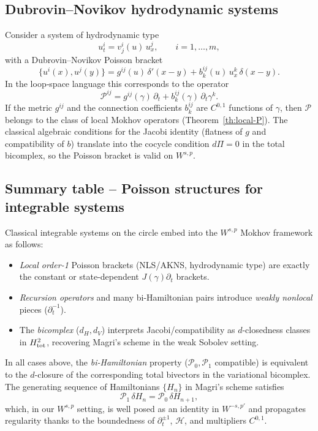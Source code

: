 \documentclass{amsart}
\newcounter{ex}
\newcounter{re}
\begin{document}
\subsection{Dubrovin–Novikov hydrodynamic systems}
Consider a system of hydrodynamic type
\[
u^{i}_{t}=v^{i}_{j}(u)\,u^{j}_{x},\qquad i=1,\dots,m,
\]
with a Dubrovin–Novikov Poisson bracket
\[
\{u^{i}(x),u^{j}(y)\}
   =g^{ij}(u)\,\delta'(x-y)
     +b^{ij}_{k}(u)\,u^{k}_{x}\,\delta(x-y).
\]
In the loop‑space language this corresponds to the operator
\[
\mathcal P^{ij}=g^{ij}(\gamma)\,\partial_{t}
                +b^{ij}_{k}(\gamma)\,\partial_{t}\gamma^{k}.
\]
If the metric \(g^{ij}\) and the connection coefficients \(b^{ij}_{k}\) are
\(C^{0,1}\) functions of \(\gamma\), then \(\mathcal P\) belongs to the class of
local Mokhov operators (Theorem~\ref{th:local-P}).  The classical algebraic
conditions for the Jacobi identity (flatness of \(g\) and compatibility of
\(b\)) translate into the cocycle condition \(d\Pi=0\) in the total bicomplex,
so the Poisson bracket is valid on \(W^{s,p}\).

\subsection{ Summary table – Poisson structures for integrable systems }

Classical integrable systems on the circle embed into the $W^{s,p}$
Mokhov framework as follows:
\begin{itemize}
\item \emph{Local order-1} Poisson brackets (NLS/AKNS, hydrodynamic type)
are exactly the constant or state-dependent $J(\gamma)\partial_t$ brackets.
\item \emph{Recursion operators} and many bi-Hamiltonian pairs introduce
\emph{weakly nonlocal} pieces (\(\partial_t^{-1}\)).
\item The \emph{bicomplex} ($d_H,d_V$) interprets Jacobi/compatibility as
$d$-closedness classes in $H^2_{\rm tot}$, recovering Magri's scheme in
the weak Sobolev setting.
\end{itemize}
In all cases above, the \emph{bi-Hamiltonian} property ($\mathcal P_0,\mathcal P_1$ compatible)
is equivalent to the $d$-closure of the corresponding total bivectors in the variational
bicomplex. The generating sequence of Hamiltonians
$\{H_n\}$ in Magri's scheme satisfies
\[
\mathcal P_1\,\delta H_n = \mathcal P_0\,\delta H_{n+1},
\]
which, in our $W^{s,p}$ setting, is well posed as an identity in $W^{-s,p'}$
and propagates regularity thanks to the boundedness of $\partial_t^{\pm1}$,
$\mathcal H$, and multipliers $C^{0,1}$.
\end{document}
